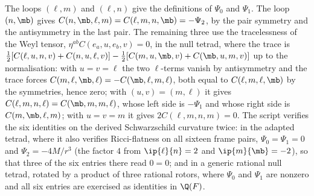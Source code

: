 The loops $(\ell, m)$ and $(\ell, n)$ give the definitions of $\Psi_{0}$ and $\Psi_{1}$. The loop $(n, \mb)$ gives $C(n, \mb, \ell, m) = C(\ell, m, n, \mb) = -\Psi_{2}$, by the pair symmetry and the antisymmetry in the last pair. The remaining three use the tracelessness of the Weyl tensor, $\eta^{ab}C(e_{a}, u, e_{b}, v) = 0$, in the null tetrad, where the trace is $\tfrac12[C(\ell, u, n, v) + C(n, u, \ell, v)] - \tfrac12[C(m, u, \mb, v) + C(\mb, u, m, v)]$ up to the normalisation: with $u = v = \ell$ the two $\ell$-terms vanish by antisymmetry and the trace forces $C(m, \ell, \mb, \ell) = -C(\mb, \ell, m, \ell)$, both equal to $C(\ell, m, \ell, \mb)$ by the symmetries, hence zero; with $(u, v) = (m, \ell)$ it gives $C(\ell, m, n, \ell) = C(\mb, m, m, \ell)$, whose left side is $-\Psi_{1}$ and whose right side is $C(m, \mb, \ell, m)$; with $u = v = m$ it gives $2C(\ell, m, n, m) = 0$. The script verifies the six identities on the derived Schwarzschild curvature twice: in the adapted tetrad, where it also verifies Ricci-flatness on all sixteen frame pairs, $\Psi_{0} = \Psi_{1} = 0$ and $\Psi_{2} = -4M/r^{3}$ (the factor $4$ from $\ip{\ell}{n} = 2$ and $\ip{m}{\mb} = -2$), so that three of the six entries there read $0 = 0$; and in a generic rational null tetrad, rotated by a product of three rational rotors, where $\Psi_{0}$ and $\Psi_{1}$ are nonzero and all six entries are exercised as identities in $\Q(F)$.
